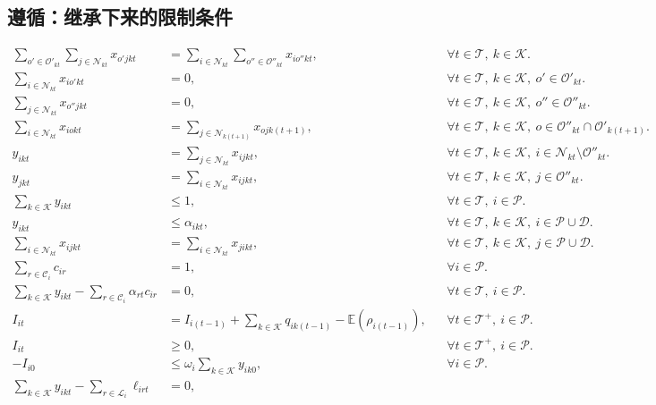 \documentclass[10pt]{article}
\begin{document}
\subsection*{遵循：继承下来的限制条件}
\begin{align}
\sum_{o'\in\mathcal O'_{kt}}\sum_{j\in\mathcal N_{kt}}x_{o'jkt}
&=\sum_{i\in\mathcal N_{kt}}\sum_{o''\in\mathcal O''_{kt}}x_{io''kt},
&&\forall t\in\mathcal T,\ k\in\mathcal K.\tag{18}\\
\sum_{i\in\mathcal N_{kt}}x_{io'kt}&=0,
&&\forall t\in\mathcal T,\ k\in\mathcal K,\ o'\in\mathcal O'_{kt}.\tag{19}\\
\sum_{j\in\mathcal N_{kt}}x_{o''jkt}&=0,
&&\forall t\in\mathcal T,\ k\in\mathcal K,\ o''\in\mathcal O''_{kt}.\tag{20}\\
\sum_{i\in\mathcal N_{kt}}x_{iokt}
&=\sum_{j\in\mathcal N_{k(t+1)}}x_{ojk(t+1)},
&&\forall t\in\mathcal T,\ k\in\mathcal K,\ o\in\mathcal O''_{kt}\cap\mathcal O'_{k(t+1)}.\tag{21}\\
 y_{ikt}&=\sum_{j\in\mathcal N_{kt}}x_{ijkt},
&&\forall t\in\mathcal T,\ k\in\mathcal K,\ i\in\mathcal N_{kt}\setminus\mathcal O''_{kt}.\tag{22}\\
 y_{jkt}&=\sum_{i\in\mathcal N_{kt}}x_{ijkt},
&&\forall t\in\mathcal T,\ k\in\mathcal K,\ j\in\mathcal O''_{kt}.\tag{23}\\
\sum_{k\in\mathcal K}y_{ikt}&\leqslant1,
&&\forall t\in\mathcal T,\ i\in\mathcal P.\tag{24}\\
 y_{ikt}&\leqslant\alpha_{ikt},
&&\forall t\in\mathcal T,\ k\in\mathcal K,\ i\in\mathcal P\cup\mathcal D.\tag{25}\\
\sum_{i\in\mathcal N_{kt}}x_{ijkt}&=\sum_{i\in\mathcal N_{kt}}x_{jikt},
&&\forall t\in\mathcal T,\ k\in\mathcal K,\ j\in\mathcal P\cup\mathcal D.\tag{26}\\
\sum_{r\in\mathcal C_i}c_{ir}&=1,
&&\forall i\in\mathcal P.\tag{27}\\
\sum_{k\in\mathcal K}y_{ikt}-\sum_{r\in\mathcal C_i}\alpha_{rt}c_{ir}&=0,
&&\forall t\in\mathcal T,\ i\in\mathcal P.\tag{28}\\
 I_{it}&=I_{i(t-1)}+\sum_{k\in\mathcal K}q_{ik(t-1)}-\mathbb E(\rho_{i(t-1)}),
&&\forall t\in\mathcal T^+,\ i\in\mathcal P.\tag{29}\\
 I_{it}&\geqslant0,
&&\forall t\in\mathcal T^+,\ i\in\mathcal P.\tag{30}\\
 -I_{i0}&\leqslant\omega_i\sum_{k\in\mathcal K}y_{ik0},
&&\forall i\in\mathcal P.\tag{31}\\
\sum_{k\in\mathcal K}y_{ikt}-\sum_{r\in\mathcal L_i}\ell_{irt}&=0,

\end{align}
\end{document}
